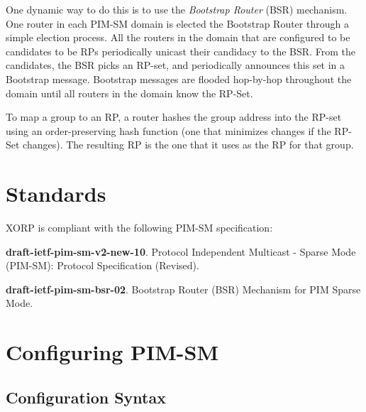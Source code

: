 One dynamic way to do this is to use the {\it Bootstrap Router} (BSR)
mechanism. 
One router in each PIM-SM domain is elected the Bootstrap Router through
a simple election process.  All the routers in the domain that are
configured to be candidates to be RPs periodically unicast their
candidacy to the BSR.  From the candidates, the BSR picks an RP-set,
and periodically announces this set in a Bootstrap message.  Bootstrap
messages are flooded hop-by-hop throughout the domain until all
routers in the domain know the RP-Set.

To map a group to an RP, a router hashes the group address into the
RP-set using an order-preserving hash function (one that minimizes
changes if the RP-Set changes).  The resulting RP is the one that it
uses as the RP for that group.

\section{Standards}

XORP is compliant with the following PIM-SM specification:
\begin{description}
\item{\bf draft-ietf-pim-sm-v2-new-10}.  Protocol Independent
  Multicast - Sparse Mode (PIM-SM): Protocol Specification (Revised).
\item{\bf draft-ietf-pim-sm-bsr-02}.  Bootstrap Router (BSR) Mechanism
  for PIM Sparse Mode.
\end{description}

\section{Configuring PIM-SM}
\subsection{Configuration Syntax}

